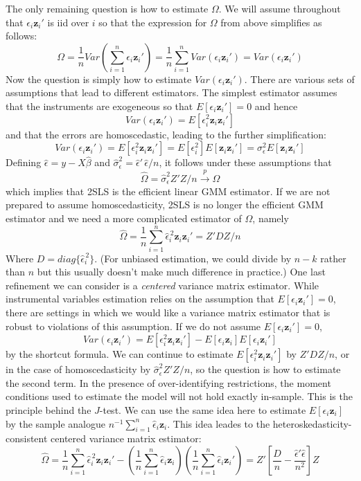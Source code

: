 \documentclass[12pt]{article}
\theoremstyle{definition}
\begin{document}
The only remaining question is how to estimate $\Omega$. We will assume throughout that  $\epsilon_i \mathbf{z}_i'$ is iid over $i$ so that the expression for $\Omega$ from above simplifies as follows:
$$\Omega = \frac{1}{n} Var \left( \sum_{i=1}^n \epsilon_i \textbf{z}_i'\right) = \frac{1}{n} \sum_{i=1}^n Var(\epsilon_i \textbf{z}_i') = Var(\epsilon_i \textbf{z}_i')$$
Now the question is simply how to estimate $Var(\epsilon_i \textbf{z}_i')$. There are various sets of assumptions that lead to different estimators. The simplest estimator assumes that the instruments are exogeneous so that $E[\epsilon_i \mathbf{z}_i'] = 0$ and hence
  $$Var(\epsilon_i \textbf{z}_i') = E[\epsilon_i^2 \textbf{z}_i\textbf{z}_i']$$
and that the errors are homoscedastic, leading to the further simplification:
  $$Var(\epsilon_i \textbf{z}_i') = E[\epsilon_i^2 \textbf{z}_i\textbf{z}_i'] = E[\epsilon_i^2]E[\textbf{z}_i \textbf{z}_i'] = \sigma_\epsilon^2 E[\textbf{z}_i \textbf{z}_i']$$
Defining $\widehat{\epsilon} = y - X\widehat{\beta}$ and $\widehat{\sigma}_\epsilon^2= \widehat{\epsilon}' \,\widehat{\epsilon}/n$, it follows under these assumptions that
  $$\widehat{\Omega} = \widehat{\sigma}_\epsilon^2 Z'Z/n \overset{p}{\rightarrow} \Omega$$
which implies that 2SLS is the efficient linear GMM estimator. If we are not prepared to assume homoscedasticity, 2SLS is no longer the efficient GMM estimator and we need a more complicated estimator of $\Omega$, namely
  $$\widehat{\Omega} = \frac{1}{n} \sum_{i=1}^n \widehat{\epsilon}_i^{\, 2} \textbf{z}_i \textbf{z}_i' = Z'DZ/n$$
Where $D = diag\{\widehat{\epsilon}_i^{\, 2}\}$. (For unbiased estimation, we could divide by $n-k$ rather than $n$ but this usually doesn't make much difference in practice.) One last refinement we can consider is a \emph{centered} variance matrix estimator. While instrumental variables estimation relies on the assumption that $E[\epsilon_i \mathbf{z}_i'] = 0$, there are settings in which we would like a variance matrix estimator that is robust to violations of this assumption. If we do not assume $E[\epsilon_i \mathbf{z}_i'] = 0$, 
  $$Var(\epsilon_i \textbf{z}_i') = E[\epsilon_i^2 \textbf{z}_i \textbf{z}_i'] - E[\epsilon_i \textbf{z}_i]E[\epsilon_i \textbf{z}_i']$$
by the shortcut formula. We can continue to estimate $E[\epsilon_i^2 \textbf{z}_i \textbf{z}_i']$ by $Z'DZ/n$, or in the case of homoscedasticity by $\widehat{\sigma}_\epsilon^2 Z'Z/n$, so the question is how to estimate the second term. In the presence of over-identifying restrictions, the moment conditions used to estimate the model will not hold exactly in-sample. This is the principle behind the $J$-test. We can use the same idea here to estimate $E[\epsilon_i \textbf{z}_i]$ by the sample analogue $n^{-1} \sum_{i=1}^n \widehat{\epsilon}_i \textbf{z}_i$. This idea leades to the heteroskedasticity-consistent centered variance matrix estimator:
  $$\widehat{\Omega} = \frac{1}{n} \sum_{i=1}^n \widehat{\epsilon}_i^{\, 2} \textbf{z}_i \textbf{z}_i' - \left( \frac{1}{n} \sum_{i=1}^n \widehat{\epsilon}_i \textbf{z}_i\right) \left(  \frac{1}{n} \sum_{i=1}^n \widehat{\epsilon}_i \textbf{z}_i'\right) = Z'\left[ \frac{D}{n} - \frac{\widehat{\epsilon}' \widehat{\epsilon}}{n^2} \right] Z$$
\end{document}
